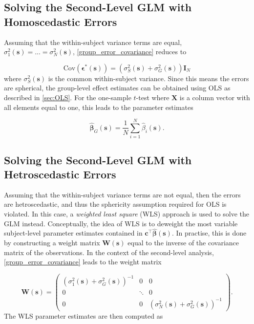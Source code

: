 \subsection{Solving the Second-Level GLM with Homoscedastic Errors}

Assuming that the within-subject variance terms are equal, $\sigma^{2}_{1}(\bm{s}) = ... = \sigma^{2}_{N}(\bm{s})$, \ref{group_error_covariance} reduces to

\begin{equation} 
\label{eq:group_homoscedastic_errors_covariance}
\mathrm{Cov}(\bm{\epsilon}^{*}(\bm{s})) = (\sigma_{S}^{2}(\bm{s}) + \sigma_{G}^{2}(\bm{s}))\bm{I}_{N}
\end{equation}
where $\sigma_{S}^{2}(\bm{s})$ is the common within-subject variance. Since this means the errors are spherical, the group-level effect estimates can be obtained using OLS as described in \ref{sec:OLS}. For the one-sample $t$-test where $\bm{X}$ is a column vector with all elements equal to one, this leads to the parameter estimates

\begin{equation} 
\label{eq:homoscedastic_parameter_estimates}
\hat{\bm{\beta}}_{G}(\bm{s}) = \frac{1}{N}\sum_{i=1}^{N} \hat{\beta}_{i}(\bm{s}).
\end{equation}

\subsection{Solving the Second-Level GLM with Hetroscedastic Errors}

Assuming that the within-subject variance terms are not equal, then the errors are hetroscedastic, and thus the sphericity assumption required for OLS is violated. In this case, a \textit{weighted least square} (WLS) approach is used to solve the GLM instead. Conceptually, the idea of WLS is to deweight the most variable subject-level parameter estimates contained in $\bm{c}^{\intercal}\hat{\bm{\beta}}(\bm{s})$. In practise, this is done by constructing a weight matrix $\bm{W}(\bm{s})$ equal to the inverse of the covariance matrix of the observations. In the context of the second-level analysis, \ref{group_error_covariance} leads to the weight matrix 

\begin{equation}
\bm{W}(\bm{s}) = 
\label{weight_matrix}
\begin{pmatrix}
(\sigma_{1}^{2}(\bm{s}) + \sigma_{G}^{2}(\bm{s}))^{-1} & 0 & 0 \\
0 & \ddots & 0 \\
0 & 0 & (\sigma_{N}^{2}(\bm{s}) + \sigma_{G}^{2}(\bm{s}))^{-1}
\end{pmatrix}.
\end{equation}
The WLS parameter estimates are then computed as

